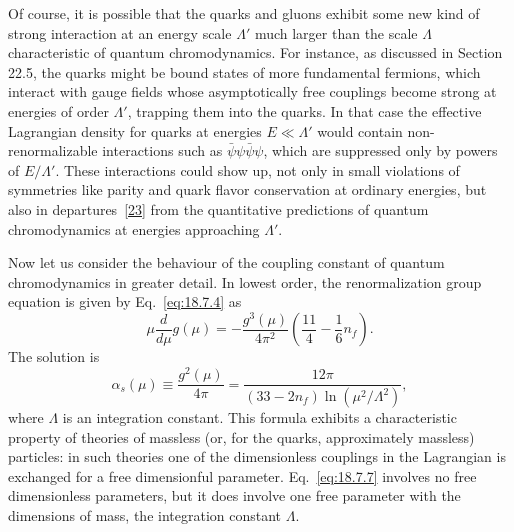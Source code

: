 Of course, it is possible that the quarks and gluons exhibit some new kind of strong interaction at an energy scale $\Lambda'$ much larger than the scale $\Lambda$ characteristic of quantum chromodynamics. For instance, as discussed in Section 22.5, the quarks might be bound states of more fundamental fermions, which interact with gauge fields whose asymptotically free couplings become strong at energies of order $\Lambda'$, trapping them into the quarks. In that case the effective Lagrangian density for quarks at energies $E\ll\Lambda'$ would contain non-renormalizable interactions such as $\bar\psi\psi\bar\psi\psi$, which are suppressed only by powers of $E/\Lambda'$. These interactions could show up, not only in small violations of symmetries like parity and quark flavor conservation at ordinary energies, but also in departures~\hyperref[ch18-ref-23]{[23]} from the quantitative predictions of quantum chromodynamics at energies approaching $\Lambda'$.

Now let us consider the behaviour of the coupling constant of quantum chromodynamics in greater detail. In lowest order, the renormalization group equation is given by Eq.~\eqref{eq:18.7.4} as
\begin{equation}
\mu\frac{d}{d\mu}g(\mu)=-\frac{g^3(\mu)}{4\pi^2}\left(\frac{11}{4}-\frac{1}{6}n_f\right).
\tag{18.7.6}\label{eq:18.7.6}
\end{equation}
The solution is
\begin{equation}
\alpha_s(\mu)\equiv\frac{g^2(\mu)}{4\pi}
=\frac{12\pi}{(33-2n_f)\ln(\mu^2/\Lambda^2)},
\tag{18.7.7}\label{eq:18.7.7}
\end{equation}
where $\Lambda$ is an integration constant. This formula exhibits a characteristic property of theories of massless (or, for the quarks, approximately massless) particles: in such theories one of the dimensionless couplings in the Lagrangian is exchanged for a free dimensionful parameter. Eq.~\eqref{eq:18.7.7} involves no free dimensionless parameters, but it does involve one free parameter with the dimensions of mass, the integration constant $\Lambda$.

